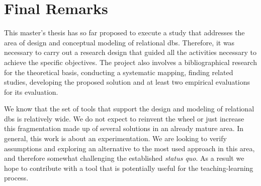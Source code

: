 \chapter{Final Remarks}
\label{chap:conclusion}

This master's thesis has so far proposed to execute a study that addresses the area of design and conceptual modeling of relational \acp{db}.
Therefore, it was necessary to carry out a research design that guided all the activities necessary to achieve the specific objectives.
The project also involves a bibliographical research for the theoretical basis, conducting a systematic mapping, finding related studies, developing the proposed solution and at least two empirical evaluations for its evaluation.

We know that the set of tools that support the design and modeling of relational \acp{db} is relatively wide.
We do not expect to reinvent the wheel or just increase this fragmentation made up of several solutions in an already mature area.
In general, this work is about an experimentation.
We are looking to verify assumptions and exploring an alternative to the most used approach in this area, and therefore somewhat challenging the established \textit{status quo}.
As a result we hope to contribute with a tool that is potentially useful for the teaching-learning process.

